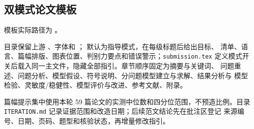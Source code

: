 \subsection{双模式论文模板}

模板实际路径为 。\par
目录保留上游
、字体和
； 默认为指导模式，在每级标题后给出目标、
清单、语言、篇幅排版、图表位置、判别力要点和错误警示；\texttt{submission.tex}
定义模式开关后载入同一主文件，隐藏全部指引。章节顺序固定为摘要与关键词、
问题重述、问题分析、模型假设、符号说明、分问题模型建立与求解、结果分析与
模型检验、灵敏度/稳健性、模型评价与改进、参考文献、附录。

篇幅提示集中使用本轮 59 篇论文的实测中位数和四分位范围，不预造比例。目录
\texttt{ITERATION.md} 记录证据范围和改造日期；后续范文结论先在批注区登记
来源编号、日期、页码、题型和核验状态，再增量修改指引。

